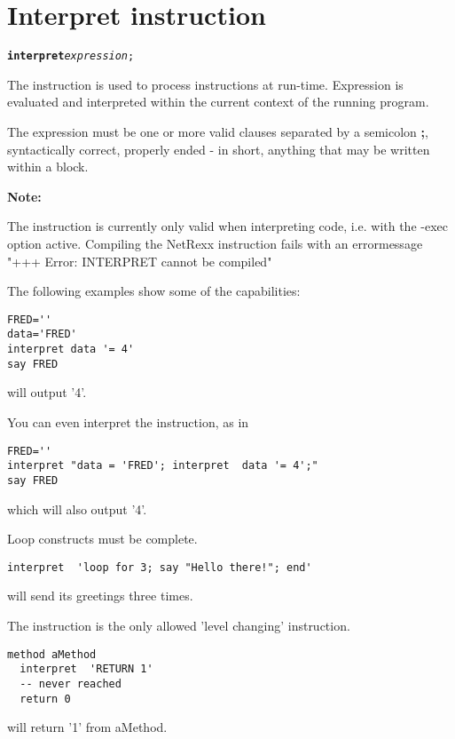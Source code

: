 \section{Interpret instruction}\label{refinterpret}
\index{}
\index{,}
\index{,}
\begin{shaded}
\begin{alltt}
\textbf{interpret} \emph{expression};

\end{alltt}
\end{shaded}

The  instruction is used to process instructions at run-time.
Expression is evaluated and interpreted within the current context of the running program.

The expression must be one or more valid clauses separated by a semicolon \textbf{;}, syntactically correct, properly ended - in short,
anything that may be written within a  block.

\begin{shaded}
\textbf{Note:}

The  instruction is currently only valid when interpreting code, i.e. with the -exec option active.\newline
Compiling the NetRexx  instruction fails with an errormessage "+++ Error: INTERPRET cannot be compiled"
\end{shaded}

The following examples show some of the capabilities:

\begin{lstlisting}
FRED=''
data='FRED'
interpret data '= 4'
say FRED
\end{lstlisting}
will output '4'.

You can even interpret the  instruction, as in

\begin{lstlisting}
FRED=''
interpret "data = 'FRED'; interpret  data '= 4';"
say FRED
\end{lstlisting}
which will also output '4'.

Loop constructs must be complete.

\begin{lstlisting}
interpret  'loop for 3; say "Hello there!"; end'
\end{lstlisting}
will send its greetings three times.

The  instruction is the only allowed 'level changing' instruction.

\begin{lstlisting}
method aMethod
  interpret  'RETURN 1'
  -- never reached
  return 0
\end{lstlisting}
will return '1' from aMethod.


